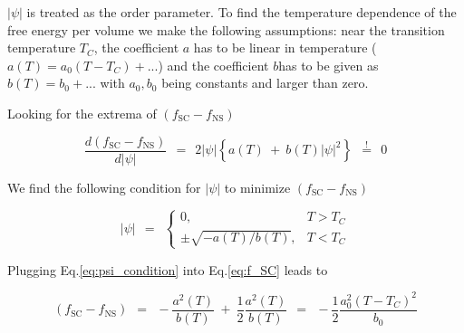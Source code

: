 \documentclass[10pt]{report}
\numberwithin{equation}{chapter}
\newcommand{\myEq}[1]{
  Eq.\ref{#1}
}
\begin{document}
$|\psi|$ is treated as the order parameter. 
To find the temperature dependence of the free energy per volume we make the following assumptions: near the transition temperature $T_C$, the coefficient $a$ has to be linear in temperature ($a(T)=a_0(T-T_C) +...$) and the coefficient $b$has to be given as $b(T)=b_0+...$ with $a_0, b_0$ being constants and larger than zero.

Looking for the extrema of $(f_\text{SC}-f_\text{NS})$

\begin{equation} \label{eq:f_SC_derived}
  \frac{d (f_\text{SC}-f_\text{NS})}{d|\psi|} ~~=~~ 2|\psi| \left\{a(T) ~+~ b(T)|\psi|^2  \right\} 
  ~~\overset{!}{=}~~ 0
\end{equation}

We find the following condition for $|\psi|$ to minimize $(f_\text{SC}-f_\text{NS})$

\begin{equation} \label{eq:psi_condition}
  |\psi| ~~=~~ \left\{ 
  \begin{array}{cr}
    0, & T>T_C\\
    \pm \sqrt{-a(T)/b(T)}, & T<T_C
  \end{array} \right.
\end{equation}

Plugging \myEq{eq:psi_condition} into \myEq{eq:f_SC} leads to

\begin{equation}
  (f_\text{SC} - f_\text{NS}) ~~=~~ -\frac{a^2(T)}{b(T)} ~+~ \frac{1}{2} \frac{a^2(T)}{b(T)} ~~=~~
  -\frac{1}{2} \frac{a_0^2(T-T_C)^2}{b_0}
\end{equation}
\end{document}
